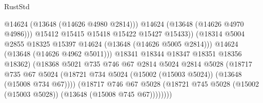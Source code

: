 \begin{lexlean}{RustStd}
\begin{coremodule}
                                                @14624
                                                (@13648 (@14626 @4980 @2814)))
                                              @14624
                                              (@13648 (@14626 @4970 @4986)))
                                            @15412
                                            @15415
                                            @15418
                                            @15422
                                            @15427
                                            @15433))
                                        (@18314
                                          @5004
                                          @2855
                                          @18325
                                          @15397
                                          @14624
                                          (@13648 (@14626 @5005 @2814)))
                                        @14624
                                        (@13648 (@14626 @4962 @5011)))
                                      @18341
                                      @18344
                                      @18347
                                      @18351
                                      @18356
                                      @18362)
                                    (@18368
                                      @5021
                                      @735
                                      @746
                                      @67
                                      @2814
                                      @5024
                                      @2814
                                      @5028
                                      (@18717
                                        @735
                                        @67
                                        @5024
                                        (@18721
                                          @734
                                          @5024
                                          (@15002 (@15003 @5024))
                                          (@13648 (@15008 @734 @67))))
                                      (@18717
                                        @746
                                        @67
                                        @5028
                                        (@18721
                                          @745
                                          @5028
                                          (@15002 (@15003 @5028))
                                          (@13648 (@15008 @745 @67))))))))

\end{coremodule}
\end{lexlean}
